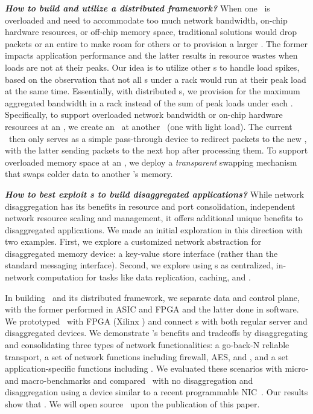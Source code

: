 \vspace{0.05in}
\noindent \textbf{\textit{How to build and utilize a distributed \snic{} framework?}}
When one \snic\ is overloaded and need to accommodate too much network bandwidth, on-chip hardware resources, or off-chip memory space, traditional solutions would drop packets or an entire \nt{} to make room for others or to provision a larger \snic. The former impacts application performance and the latter results in resource wastes when loads are not at their peaks. 
Our idea is to utilize other \snic{}s to handle load spikes, based on the observation that not all \snic{}s under a rack would run at their peak load at the same time. Essentially, with distributed \snic{}s, we provision for the maximum aggregated bandwidth in a rack instead of the sum of peak loads under each \snic.
Specifically, to support overloaded network bandwidth or on-chip hardware resources at an \snic, we create an \nt\ at another \snic\ (one with light load). 
The current \snic\ then only serves as a simple pass-through device to redirect packets to the new \snic, with the latter sending packets to the next hop after processing them.
To support overloaded memory space at an \snic, we deploy a {\em transparent} swapping mechanism that swaps colder data to another \snic's memory.

\vspace{0.05in}
\noindent \textbf{\textit{How to best exploit \snic{}s to build disaggregated applications?}}
While network disaggregation has its benefits in resource and port consolidation, independent network resource scaling and management, it offers additional unique benefits to disaggregated applications. 
We made an initial exploration in this direction with two examples.
First, we explore a customized network abstraction for disaggregated memory device: a key-value store interface (rather than the standard messaging interface).
Second, we explore using \snic{}s as centralized, in-network computation for tasks like data replication, caching, and .


In building \snic\ and its distributed framework, we separate data and control plane, with the former performed in ASIC and FPGA and the latter done in software.
We prototyped \snic\ with FPGA (Xilinx ) and connect \snic{}s with both regular server and disaggregated devices.
We demonstrate \snic's benefits and tradeoffs by disaggregating and consolidating three types of network functionalities:
a go-back-N reliable transport, a set of network functions including firewall, AES, and , and a set application-specific functions including .
We evaluated these scenarios with micro- and macro-benchmarks and compared \snic\ with no disaggregation and disaggregation using a device similar to a recent programmable NIC~\cite{PANIC}.
Our results show that .
We will open source \snic\ upon the publication of this paper.



%
%
%
